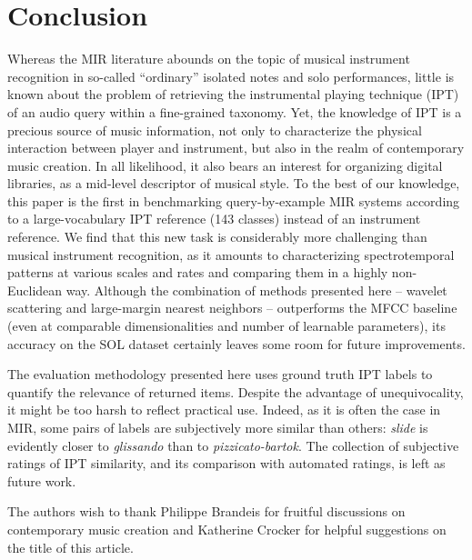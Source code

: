 \section{Conclusion}

Whereas the MIR literature abounds on the topic of musical instrument recognition in so-called ``ordinary'' isolated notes and solo performances, little is known about the problem of retrieving the instrumental playing technique (IPT) of an audio query within a fine-grained taxonomy.
Yet, the knowledge of IPT is a precious source of music information, not only to characterize the physical interaction between player and instrument, but also in the realm of contemporary music creation.
In all likelihood, it also bears an interest for organizing digital libraries, as a mid-level descriptor of musical style.
To the best of our knowledge, this paper is the first in benchmarking query-by-example MIR systems according to a large-vocabulary IPT reference (143 classes) instead of an instrument reference.
We find that this new task is considerably more challenging than musical instrument recognition, as it amounts to characterizing spectrotemporal patterns at various scales and rates and comparing them in a highly non-Euclidean way.
Although the combination of methods presented here -- wavelet scattering and large-margin nearest neighbors -- outperforms the MFCC baseline (even at comparable dimensionalities and number of learnable parameters), its accuracy on the SOL dataset certainly leaves some room for future improvements.

The evaluation methodology presented here uses ground truth IPT labels to quantify the relevance of returned items.
Despite the advantage of unequivocality, it might be too harsh to reflect practical use.
Indeed, as it is often the case in MIR, some pairs of labels are subjectively more similar than others: \eg{} \emph{slide} is evidently closer to \emph{glissando} than to \emph{pizzicato-bartok}.
The collection of subjective ratings of IPT similarity, and its comparison with automated ratings, is left as future work.




\begin{acks}
The authors wish to thank Philippe Brandeis for fruitful discussions on contemporary music creation
and Katherine Crocker for helpful suggestions on the title of this article.
\end{acks}
